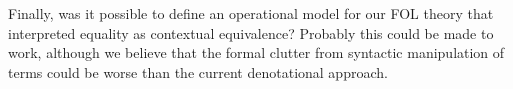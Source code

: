 Finally, was it possible to define an operational model for our FOL theory that interpreted
equality as contextual equivalence? Probably this could be made to work, although we believe
that the formal clutter from syntactic manipulation of terms could be worse than the current
denotational approach. 

